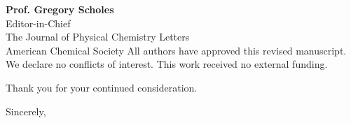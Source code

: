 \documentclass[11pt,a4paper]{letter}
\begin{document}
\begin{letter}{
\textbf{Prof. Gregory Scholes}\\
Editor-in-Chief\\
The Journal of Physical Chemistry Letters\\
American Chemical Society
}
All authors have approved this revised manuscript. We declare no conflicts of interest. This work received no external funding.

Thank you for your continued consideration.

\closing{Sincerely,}


\end{letter}
\end{document}
